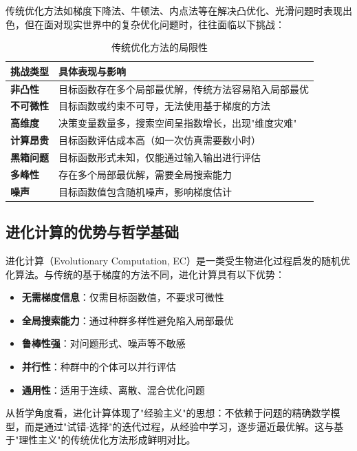传统优化方法如梯度下降法、牛顿法、内点法等在解决凸优化、光滑问题时表现出色，但在面对现实世界中的复杂优化问题时，往往面临以下挑战：

\begin{table}[H]
\centering
\caption{传统优化方法的局限性}
\begin{tabular}{p{}p{}}
\toprule
\textbf{挑战类型} & \textbf{具体表现与影响} \\
\midrule
\textbf{非凸性} & 目标函数存在多个局部最优解，传统方法容易陷入局部最优 \\
\hline
\textbf{不可微性} & 目标函数或约束不可导，无法使用基于梯度的方法 \\
\hline
\textbf{高维度} & 决策变量数量多，搜索空间呈指数增长，出现"维度灾难" \\
\hline
\textbf{计算昂贵} & 目标函数评估成本高（如一次仿真需要数小时） \\
\hline
\textbf{黑箱问题} & 目标函数形式未知，仅能通过输入输出进行评估 \\
\hline
\textbf{多峰性} & 存在多个局部最优解，需要全局搜索能力 \\
\hline
\textbf{噪声} & 目标函数值包含随机噪声，影响梯度估计 \\
\bottomrule
\end{tabular}
\end{table}

\subsection{进化计算的优势与哲学基础}

进化计算（Evolutionary Computation, EC）是一类受生物进化过程启发的随机优化算法。与传统的基于梯度的方法不同，进化计算具有以下优势：

\begin{itemize}
    \item \textbf{无需梯度信息}：仅需目标函数值，不要求可微性
    \item \textbf{全局搜索能力}：通过种群多样性避免陷入局部最优
    \item \textbf{鲁棒性强}：对问题形式、噪声等不敏感
    \item \textbf{并行性}：种群中的个体可以并行评估
    \item \textbf{通用性}：适用于连续、离散、混合优化问题
\end{itemize}

从哲学角度看，进化计算体现了"经验主义"的思想：不依赖于问题的精确数学模型，而是通过"试错-选择"的迭代过程，从经验中学习，逐步逼近最优解。这与基于"理性主义"的传统优化方法形成鲜明对比。

